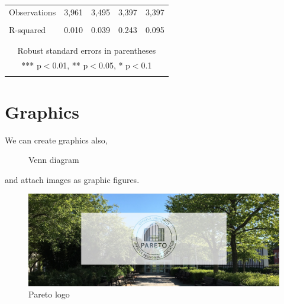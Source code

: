 \documentclass{article}[12pt]
\begin{document}
\begin{table}[H]
\begin{tabular}{lcccc}
                Observations & 3,961 & 3,495 & 3,397 & 3,397 \\
                 \\
                R-squared & 0.010 & 0.039 & 0.243 & 0.095 \\\\ \hline
                 \\
                \multicolumn{5}{c}{ Robust standard errors in parentheses} \\
                \multicolumn{5}{c}{ *** p$<$0.01, ** p$<$0.05, * p$<$0.1} \\
                \\ \hline
            \end{tabular}
        \end{table}
        
    \section{Graphics}
    
        We can create graphics also,
        \begin{figure}[H] %
            \centering
            \caption{Venn diagram}
        \end{figure}
        
        and attach images as graphic figures.
        \begin{figure}[H]
            \centering
            \includegraphics[width=\textwidth]{attachments/0-pareto.jpg}
            \caption{Pareto logo}
        \end{figure}
        
\end{document}
